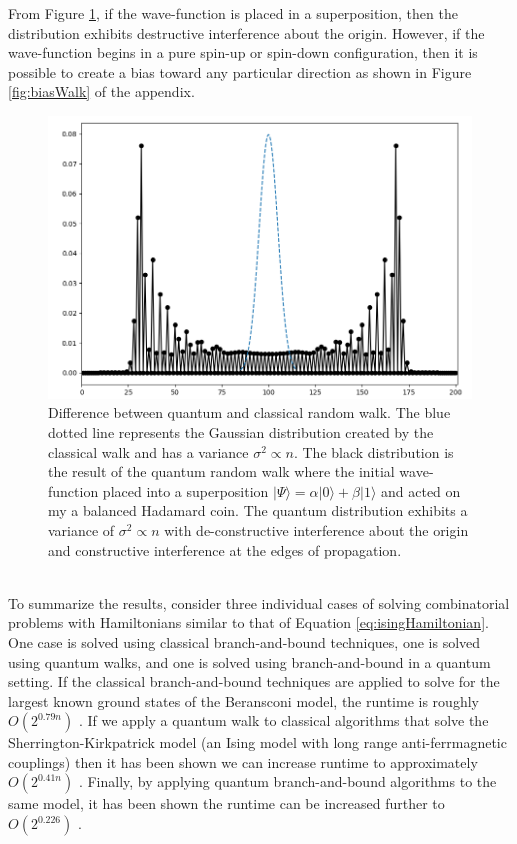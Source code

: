 From Figure \ref{fig:quantumWalk}, if the wave-function is placed in a superposition, then the distribution exhibits destructive interference about the origin.
However, if the wave-function begins in a pure spin-up or spin-down configuration, then it is possible to create a bias toward any particular direction as shown in Figure \ref{fig:biasWalk} of the appendix.
\begin{figure}[h]
	\begin{center}
		\includegraphics[width=12cm]{images/afunc2}
	\end{center}
	\caption{Difference between quantum and classical random walk. The blue dotted line represents the Gaussian distribution created by the classical walk and has a variance $\sigma^2 \propto n$. The black distribution is the result of the quantum random walk where the initial wave-function placed into a superposition $|\Psi\rangle = \alpha|0\rangle + \beta|1\rangle$ and acted on my a balanced Hadamard coin. The quantum distribution exhibits a variance of $\sigma^2 \propto n$ with de-constructive interference about the origin and constructive interference at the edges of propagation.}
	\label{fig:quantumWalk}
\end{figure}\\
To summarize the results, consider three individual cases of solving combinatorial problems with Hamiltonians similar to that of Equation \ref{eq:isingHamiltonian}.
One case is solved using classical branch-and-bound techniques, one is solved using quantum walks, and one is solved using branch-and-bound in a quantum setting. 
If the classical branch-and-bound techniques are applied to solve for the largest known ground states of the Beransconi model, the runtime is roughly $O(2^{0.79n})$ \cite{packebusch2016low}. 
If we apply a quantum walk to classical algorithms that solve the Sherrington-Kirkpatrick model (an Ising model with long range anti-ferrmagnetic couplings) then it has been shown we can increase runtime to approximately $O(2^{0.41n})$ \cite{callison2019finding}. 
Finally, by applying quantum branch-and-bound algorithms to the same model, it has been shown the runtime can be increased further to $O(2^{0.226})$ \cite{montanaro2020quantum}.